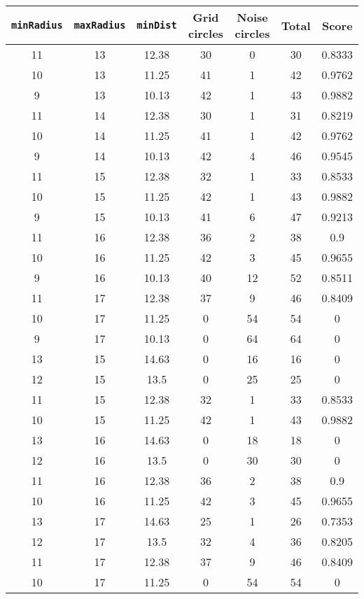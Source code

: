 \documentclass[letterpaper, 12pt]{article}
\begin{document}
\begin{longtable}{|c|c|c|c|c|c|c|}
\hline
\textbf{\texttt{minRadius}} & \textbf{\texttt{maxRadius}} & \textbf{\texttt{minDist}} & \textbf{Grid circles} & \textbf{Noise circles} & \textbf{Total} & \textbf{Score} \\
\hline
11 & 13 & 12.38 & 30 & 0 & 30 & 0.8333 \\
\hline
10 & 13 & 11.25 & 41 & 1 & 42 & 0.9762 \\
\hline
9 & 13 & 10.13 & 42 & 1 & 43 & 0.9882 \\
\hline
11 & 14 & 12.38 & 30 & 1 & 31 & 0.8219 \\
\hline
10 & 14 & 11.25 & 41 & 1 & 42 & 0.9762 \\
\hline
9 & 14 & 10.13 & 42 & 4 & 46 & 0.9545 \\
\hline
11 & 15 & 12.38 & 32 & 1 & 33 & 0.8533 \\
\hline
10 & 15 & 11.25 & 42 & 1 & 43 & 0.9882 \\
\hline
9 & 15 & 10.13 & 41 & 6 & 47 & 0.9213 \\
\hline
11 & 16 & 12.38 & 36 & 2 & 38 & 0.9 \\
\hline
10 & 16 & 11.25 & 42 & 3 & 45 & 0.9655 \\
\hline
9 & 16 & 10.13 & 40 & 12 & 52 & 0.8511 \\
\hline
11 & 17 & 12.38 & 37 & 9 & 46 & 0.8409 \\
\hline
10 & 17 & 11.25 & 0 & 54 & 54 & 0 \\
\hline
9 & 17 & 10.13 & 0 & 64 & 64 & 0 \\
\hline
13 & 15 & 14.63 & 0 & 16 & 16 & 0 \\
\hline
12 & 15 & 13.5 & 0 & 25 & 25 & 0 \\
\hline
11 & 15 & 12.38 & 32 & 1 & 33 & 0.8533 \\
\hline
10 & 15 & 11.25 & 42 & 1 & 43 & 0.9882 \\
\hline
13 & 16 & 14.63 & 0 & 18 & 18 & 0 \\
\hline
12 & 16 & 13.5 & 0 & 30 & 30 & 0 \\
\hline
11 & 16 & 12.38 & 36 & 2 & 38 & 0.9 \\
\hline
10 & 16 & 11.25 & 42 & 3 & 45 & 0.9655 \\
\hline
13 & 17 & 14.63 & 25 & 1 & 26 & 0.7353 \\
\hline
12 & 17 & 13.5 & 32 & 4 & 36 & 0.8205 \\
\hline
11 & 17 & 12.38 & 37 & 9 & 46 & 0.8409 \\
\hline
10 & 17 & 11.25 & 0 & 54 & 54 & 0 \\

\end{longtable}
\end{document}
